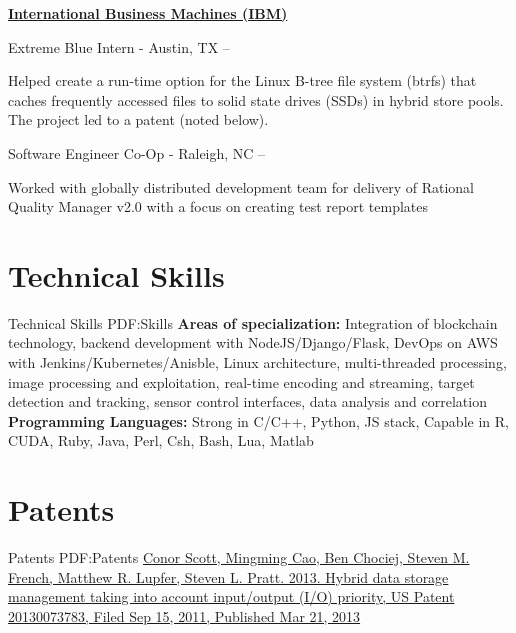 \documentclass[a4paper,10pt,oneside]{article}
\begin{document}
\begin{body}
\EntryGap

\href{www.ibm.com}
{\textbf{International Business Machines (IBM)}}
\par
Extreme Blue Intern - Austin, TX
\hfill
{} --
\begin{detail}
\BulletItem
Helped create a run-time option for the Linux B-tree file system (btrfs) that caches frequently accessed files to solid state drives (SSDs) in hybrid store pools. The project led to a patent (noted below). 
\end{detail}

\par
Software Engineer Co-Op - Raleigh, NC
\hfill
{} --
\begin{detail}
\BulletItem
Worked with globally distributed development team for delivery of Rational Quality Manager v2.0 with a focus on creating test report templates
\end{detail}


\section
{Technical Skills}
{Technical Skills}
{PDF:Skills}
\textbf{Areas of specialization:} Integration of blockchain technology, backend development with NodeJS/Django/Flask, DevOps on AWS with Jenkins/Kubernetes/Anisble, Linux architecture, multi-threaded processing, image processing and exploitation, real-time encoding and streaming, target detection and tracking, sensor control interfaces, data analysis and correlation
\newline
\textbf{Programming Languages:} Strong in C/C++, Python, JS stack, Capable in R, CUDA, Ruby, Java, Perl, Csh, Bash, Lua, Matlab


\section
{Patents}
{Patents}
{PDF:Patents}
\href{https://www.google.com/patents/US20130073783}
{Conor Scott, Mingming Cao, Ben Chociej, Steven M. French, Matthew R. Lupfer, Steven L. Pratt. 2013. Hybrid data storage management taking into account input/output (I/O) priority, US Patent 20130073783, Filed Sep 15, 2011, Published Mar 21, 2013 }
\end{body}

\label{LastPage}~
\end{document}
